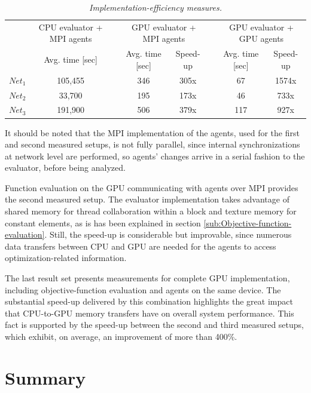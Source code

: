 \begin{table}
\caption{\textit{Implementation-efficiency measures.\label{tab:speedup-results}}}


\centering

\begin{tabular}{cccccccc}
\toprule 
 & \multicolumn{1}{c}{CPU evaluator + MPI agents} &  & \multicolumn{2}{c}{GPU evaluator + MPI agents} &  & \multicolumn{2}{c}{GPU evaluator + GPU agents}\tabularnewline\addlinespace
\cmidrule{2-2} \cmidrule{4-5} \cmidrule{7-8} 
 & Avg. time {[}sec{]} &  & Avg. time {[}sec{]} & Speed-up &  & Avg. time {[}sec{]} & Speed-up\tabularnewline\addlinespace
\cmidrule{1-2} \cmidrule{4-5} \cmidrule{7-8} 
$Net_{1}$ & 105,455 &  & 346 & 305x &  & 67 & 1574x\tabularnewline
$Net_{2}$ & 33,700 &  & 195 & 173x &  & 46 & 733x\tabularnewline
$Net_{3}$ & 191,900 &  & 506 & 379x &  & 117 & 927x\tabularnewline
\bottomrule
\end{tabular}
\end{table}


It should be noted that the MPI implementation of the agents, used
for the first and second measured setups, is not fully parallel, since
internal synchronizations at network level are performed, so agents'
changes arrive in a serial fashion to the evaluator, before being
analyzed. 

Function evaluation on the GPU communicating with agents over MPI
provides the second measured setup. The evaluator implementation takes
advantage of shared memory for thread collaboration within a block
and texture memory for constant elements, as is has been explained
in section \ref{sub:Objective-function-evaluation}. Still, the speed-up
is considerable but improvable, since numerous data transfers between
CPU and GPU are needed for the agents to access optimization-related
information.

The last result set presents measurements for complete GPU implementation,
including objective-function evaluation and agents on the same device.
The substantial speed-up delivered by this combination highlights
the great impact that CPU-to-GPU memory transfers have on overall
system performance. This fact is supported by the speed-up between
the second and third measured setups, which exhibit, on average, an
improvement of more than 400\%.


\section{Summary}

